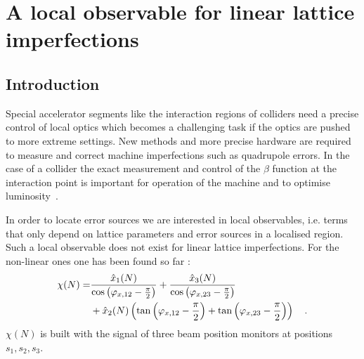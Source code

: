 \chapter{A local observable for linear lattice imperfections}
\label{ch_localobs}

\newcommand{\combtoangle}[3]{
  $\SI{#1}{\degree} - \SI{#2}{\degree} - \SI{#3}{\degree}$
}

\newcommand{\noiserms}{$0.7\times 10^{-3}\times 2\pi$ rad{}}
\newcommand{\highnoise}{$1.8\times 10^{-3}\times 2\pi$ rad{}}

\newcommand{\maxfigwidth}{8.5cm}


\section{Introduction}


Special accelerator segments like the interaction regions of colliders
need a precise control of local optics which becomes a challenging task
if the optics are pushed to more extreme settings. New methods and more
precise hardware are required to measure and correct machine
imperfections such as quadrupole errors. In the case of a collider the
exact measurement and control of the $\beta$ function at the interaction point is important for operation of
the machine and to optimise luminosity~\cite{jaime}.


In order to locate error sources we are interested in local
observables, i.e. terms that only depend on lattice parameters and error sources in a localised
region. Such a local observable does not exist for linear lattice imperfections. For the non-linear
ones one has been found so far
\cite{Tomas2005, Franchi2007}: 
%
\begin{align}
  \chi(N) =& \frac{\hat{x}_1(N)}{\cos \left( \varphi_{x,12} - \frac{\pi}{2} \right)} 
  + \frac{\hat{x}_3(N)}{\cos\left( \varphi_{x,23}-\frac{\pi}{2} \right)} \notag \\
  &+ \hat{x}_2 (N) \left(
    \tan\left( \varphi_{x,12}-\frac{\pi}{2} \right)
    + \tan\left( \varphi_{x,23}-\frac{\pi}{2} \right)
  \right)
  \quad .
  \label{eq_chi}
\end{align}
%
$\chi (N)$ is built with the signal of three beam position monitors at positions $s_1, s_2, s_3$.

